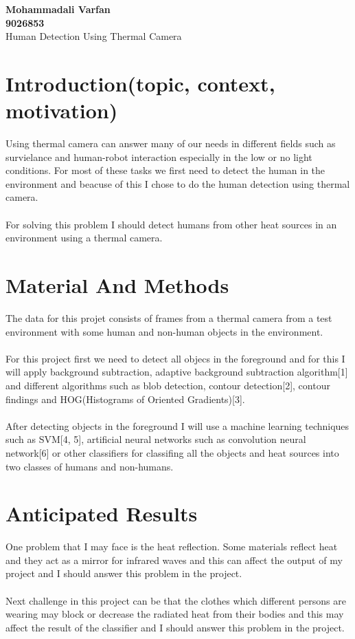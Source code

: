 \documentclass[•]{article}
\title{}
\author{}
\begin{document}
\begin{center}
\textbf{Mohammadali Varfan}\\
\textbf{9026853}\\
\hfill \break
\hfill \break
{\huge Human Detection Using Thermal Camera}\\
\end{center}
\hfill \break
\hfill \break


\section{Introduction(topic, context, motivation)}
Using thermal camera can answer many of our needs in different fields such as survielance and human-robot interaction especially in the low or no light conditions. For most of these tasks we first need to detect the human in the environment and beacuse of this I chose to do the human detection using thermal camera.\\
\\For solving this problem I should detect humans from other heat sources in an environment using a thermal camera.
\section{Material And Methods}
The data for this projet consists of frames from a thermal camera from a test environment with some human and non-human objects in the environment.\\
\\For this project first we need to detect all objecs in the foreground and for this I will apply background subtraction, adaptive background subtraction algorithm[1] and different algorithms such as blob detection, contour detection[2], contour findings and HOG(Histograms of Oriented Gradients)[3].\\
\\After detecting objects in the foreground I will use a machine learning techniques such as SVM[4, 5], artificial neural networks such as convolution neural network[6] or other classifiers for classifing all the objects and heat sources into two classes of humans and non-humans.

\section{Anticipated Results}
One problem that I may face is the heat reflection. Some materials reflect heat and they act as a mirror for infrared waves and this can affect the output of my project and I should answer this problem in the project.\\
\\Next challenge in this project can be that the clothes which different persons are wearing may block or decrease the radiated heat from their bodies and this may affect the result of the classifier and I should answer this problem in the project.
\end{document}

